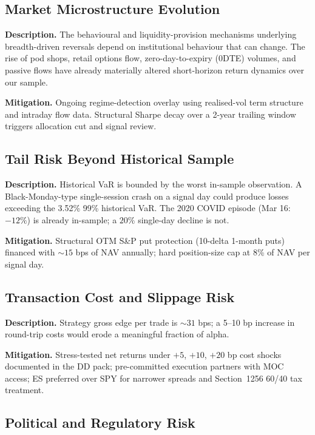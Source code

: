 \documentclass[11pt]{article}
\begin{document}
\subsection{Market Microstructure Evolution}

\textbf{Description.} The behavioural and liquidity-provision mechanisms
underlying breadth-driven reversals depend on institutional behaviour that
can change. The rise of pod shops, retail options flow, zero-day-to-expiry
(0DTE) volumes, and passive flows have already materially altered
short-horizon return dynamics over our sample.

\textbf{Mitigation.} Ongoing regime-detection overlay using realised-vol
term structure and intraday flow data. Structural Sharpe decay over a
2-year trailing window triggers allocation cut and signal review.

\subsection{Tail Risk Beyond Historical Sample}

\textbf{Description.} Historical VaR is bounded by the worst in-sample
observation. A Black-Monday-type single-session crash on a signal day
could produce losses exceeding the 3.52\% 99\% historical VaR. The 2020
COVID episode (Mar 16: $-12\%$) is already in-sample; a $20\%$ single-day
decline is not.

\textbf{Mitigation.} Structural OTM S\&P put protection (10-delta 1-month
puts) financed with $\sim 15$ bps of NAV annually; hard position-size cap
at 8\% of NAV per signal day.

\subsection{Transaction Cost and Slippage Risk}

\textbf{Description.} Strategy gross edge per trade is $\sim 31$ bps; a
5--10 bp increase in round-trip costs would erode a meaningful fraction of
alpha.

\textbf{Mitigation.} Stress-tested net returns under $+5$, $+10$, $+20$
bp cost shocks documented in the DD pack; pre-committed execution partners
with MOC access; ES preferred over SPY for narrower spreads and
Section~1256 60/40 tax treatment.

\subsection{Political and Regulatory Risk}
\end{document}
